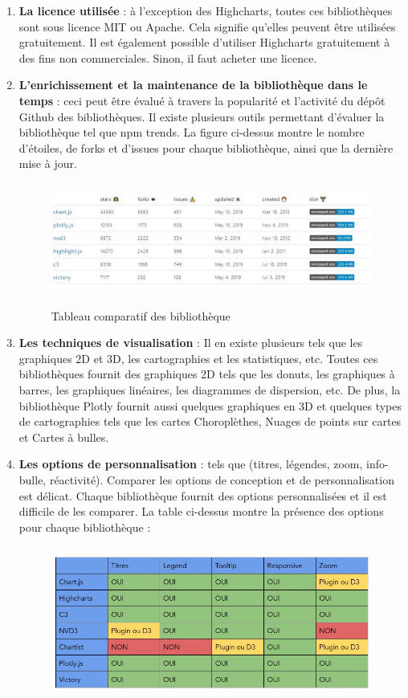 \documentclass[french, a4paper, 12pt]{report}
\begin{document}
\begin{enumerate}
  \item \textbf{La licence utilisée} : à l'exception des Highcharts, toutes ces bibliothèques sont sous licence MIT ou Apache. Cela signifie qu'elles peuvent être utilisées gratuitement. Il est également possible d’utiliser Highcharts gratuitement à des fins non commerciales. Sinon, il faut  acheter une licence.
  \item \textbf{L'enrichissement et la maintenance de la bibliothèque dans le temps} : ceci peut être évalué à travers la popularité et l’activité du dépôt Github des bibliothèques. Il existe plusieurs outils permettant d'évaluer la bibliothèque tel que npm trends. La figure ci-dessus montre le nombre d'étoiles, de forks  et d’issues pour chaque bibliothèque, ainsi que la dernière mise à jour. 
  \begin{figure}[!ht]
    \centering
    \includegraphics[height=4cm]{images/npm-trends-stat.jpg}
    \caption{Tableau comparatif des bibliothèque}
    \label{fig:3.1}
\end{figure}
  \item \textbf{Les techniques de visualisation} : Il en existe plusieurs tels que les graphiques 2D et 3D, les cartographies et les statistiques, etc. Toutes ces bibliothèques fournit des graphiques 2D tels que les donuts, les graphiques à barres, les graphiques linéaires, les diagrammes de dispersion, etc. De plus, la bibliothèque Plotly fournit aussi quelques graphiques en 3D et quelques types de cartographies tels que les cartes Choroplèthes, Nuages de points sur cartes et Cartes à bulles.
  \item \textbf{Les options de personnalisation} : tels que (titres, légendes, zoom, info-bulle, réactivité). Comparer les options de conception et de personnalisation est délicat. Chaque bibliothèque fournit des options personnalisées et il est difficile de les comparer. La table ci-dessus montre la présence des options pour chaque bibliothèque :
  \begin{figure}[!ht]
    \centering
    \includegraphics[height=5cm]{images/options-table.jpg}

\end{figure}
\end{enumerate}
\end{document}
